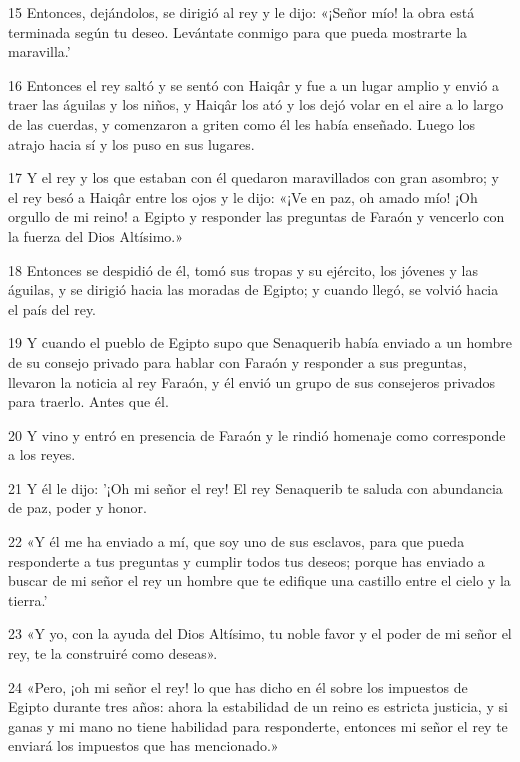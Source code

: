 \par 15 Entonces, dejándolos, se dirigió al rey y le dijo: «¡Señor mío! la obra está terminada según tu deseo. Levántate conmigo para que pueda mostrarte la maravilla.'

\par 16 Entonces el rey saltó y se sentó con Haiqâr y fue a un lugar amplio y envió a traer las águilas y los niños, y Haiqâr los ató y los dejó volar en el aire a lo largo de las cuerdas, y comenzaron a griten como él les había enseñado. Luego los atrajo hacia sí y los puso en sus lugares.

\par 17 Y el rey y los que estaban con él quedaron maravillados con gran asombro; y el rey besó a Haiqâr entre los ojos y le dijo: «¡Ve en paz, oh amado mío! ¡Oh orgullo de mi reino! a Egipto y responder las preguntas de Faraón y vencerlo con la fuerza del Dios Altísimo.»

\par 18 Entonces se despidió de él, tomó sus tropas y su ejército, los jóvenes y las águilas, y se dirigió hacia las moradas de Egipto; y cuando llegó, se volvió hacia el país del rey.

\par 19 Y cuando el pueblo de Egipto supo que Senaquerib había enviado a un hombre de su consejo privado para hablar con Faraón y responder a sus preguntas, llevaron la noticia al rey Faraón, y él envió un grupo de sus consejeros privados para traerlo. Antes que él.

\par 20 Y vino y entró en presencia de Faraón y le rindió homenaje como corresponde a los reyes.

\par 21 Y él le dijo: '¡Oh mi señor el rey! El rey Senaquerib te saluda con abundancia de paz, poder y honor.

\par 22 «Y él me ha enviado a mí, que soy uno de sus esclavos, para que pueda responderte a tus preguntas y cumplir todos tus deseos; porque has enviado a buscar de mi señor el rey un hombre que te edifique una castillo entre el cielo y la tierra.'

\par 23 «Y yo, con la ayuda del Dios Altísimo, tu noble favor y el poder de mi señor el rey, te la construiré como deseas».

\par 24 «Pero, ¡oh mi señor el rey! lo que has dicho en él sobre los impuestos de Egipto durante tres años: ahora la estabilidad de un reino es estricta justicia, y si ganas y mi mano no tiene habilidad para responderte, entonces mi señor el rey te enviará los impuestos que has mencionado.»

